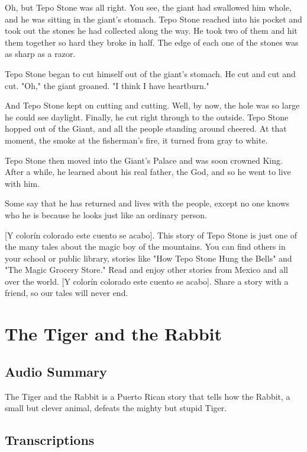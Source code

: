 Oh, but Tepo Stone was all right. You see, the giant had swallowed him whole, and he was sitting in the giant's stomach. Tepo Stone reached into his pocket and took out the stones he had collected along the way. He took two of them and hit them together so hard they broke in half. The edge of each one of the stones was as sharp as a razor.

Tepo Stone began to cut himself out of the giant's stomach. He cut and cut and cut. "Oh," the giant groaned. "I think I have heartburn."

And Tepo Stone kept on cutting and cutting. Well, by now, the hole was so large he could see daylight. Finally, he cut right through to the outside. Tepo Stone hopped out of the Giant, and all the people standing around cheered. At that moment, the smoke at the fisherman's fire, it turned from gray to white.

Tepo Stone then moved into the Giant's Palace and was soon crowned King. After a while, he learned about his real father, the God, and so he went to live with him.

Some say that he has returned and lives with the people, except no one knows who he is because he looks just like an ordinary person.

    [Y colorín colorado este cuento se acabo]. This story of Tepo Stone is just one of the many tales about the magic boy of the mountains. You can find others in your school or public library, stories like "How Tepo Stone Hung the Bells" and "The Magic Grocery Store." Read and enjoy other stories from Mexico and all over the world.  [Y colorín colorado este cuento se acabo]. Share a story with a friend, so our tales will never end.

\section{The Tiger and the Rabbit}

\subsection{Audio Summary}

The Tiger and the Rabbit is a Puerto Rican story that tells how the Rabbit, a small but clever animal, defeats the mighty but stupid Tiger.

\subsection{Transcriptions}

